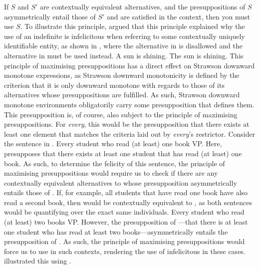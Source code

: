 \ex{}
{}
If $S$ and $S'$ are contextually equivalent alternatives, and the presuppositions of $S$ asymmetrically entail those of $S'$ and are satisfied in the context, then you must use $S$.\hfill\parencite[p.~134]{Crnic2014-dogma}
\xe
To illustrate this principle, \textcite[p.~134]{Crnic2014-nm} argued that this principle explained why the use of an indefinite is infelicitous when referring to some contextually uniquely identifiable entity, as shown in , where the alternative in  is disallowed and the alternative in  must be used instead.
\pex[nopreamble=true]\label{ex:maxpresup}%
\a{}\ljudge{\#} A sun is shining.
\a{} The sun is shining.\hfill\parencite[p.~134]{Crnic2014-dogma}
\xe
This principle of maximising presuppositions has a direct effect on Strawson downward monotone expressions, as Strawson downward monotonicity is defined by the criterion that it is only downward monotone with regards to those of its alternatives whose presuppositions are fulfilled. As such, Strawson downward monotone environments obligatorily carry some presupposition that defines them. This presupposition is, of course, also subject to the principle of maximising presuppositions. For \textit{every}, this would be the presupposition that there exists at least one element that matches the criteria laid out by \textit{every}'s restrictor. Consider the sentence in .
\ex{}
Every student who read (at least) one book VP.
\xe
Here,  presupposes that there exists at least one student that has read (at least) one book. As such, to determine the felicity of this sentence, the principle of maximising presuppositions would require us to check if there are any contextually equivalent alternatives to  whose presupposition asymmetrically entails those of . If, for example, all students that have read one book have also read a second book, then  would be contextually equivalent to , as both sentences would be quantifying over the exact same individuals.
\ex{}
Every student who read (at least) two books VP.
\xe
However, the presupposition of ---that there is at least one student who has read at least two books---asymmetrically entails the presupposition of . As such, the principle of maximising presuppositions would force us to use  in such contexts, rendering the use of  infelicitous in these cases. \textcite{Crnic2014-dogma} illustrated this using .
